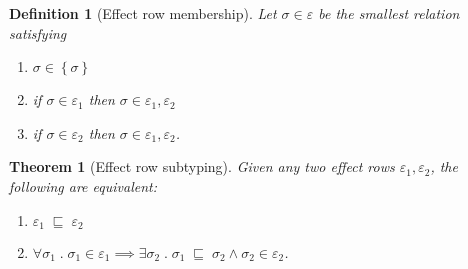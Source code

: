 \documentclass[12pt]{article}
\newtheorem{definition}{Definition}
\newtheorem{theorem}{Theorem}
\newcommand\type{\sigma}
\newcommand\row{\varepsilon}
\newcommand\rsingleton[1]{\left\{ #1 \right\}}
\newcommand\runion[2]{#1, #2}
\newcommand\subtype[2]{#1 \; \sqsubseteq \; #2} %
\begin{document}
  \begin{definition}[Effect row membership]
    Let $\type \in \row$ be the smallest relation satisfying
    \begin{enumerate}
      \item $\type \in \rsingleton{\type}$
      \item if $\type \in \row_1$ then $\type \in \runion{\row_1}{\row_2}$
      \item if $\type \in \row_2$ then $\type \in \runion{\row_1}{\row_2}$.
    \end{enumerate}
  \end{definition}

  \begin{theorem}[Effect row subtyping]
    Given any two effect rows $\row_1, \row_2$, the following are equivalent:
    \begin{enumerate}
      \item $\subtype{\row_1}{\row_2}$
      \item $\forall \type_1 \;.\; \type_1 \in \row_1 \implies \exists \type_2 \;.\; \subtype{\type_1}{\type_2} \wedge \type_2 \in \row_2$.
    \end{enumerate}
  \end{theorem}
\end{document}
